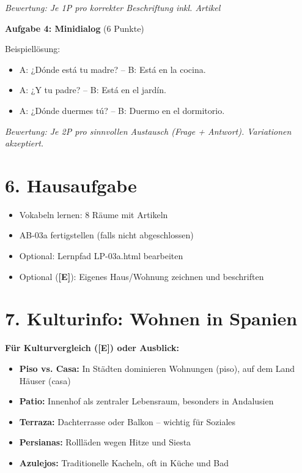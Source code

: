 \documentclass[11pt, a4paper]{article}
\newcommand{\E}{\textcolor{erweiterung}{\textbf{[E]}}}
\begin{document}
\textit{Bewertung: Je 1P pro korrekter Beschriftung inkl. Artikel}

\vspace{1em}

\textbf{Aufgabe 4: Minidialog} (6 Punkte)

Beispiellösung:
\begin{itemize}
    \item A: ¿Dónde está tu madre? -- B: Está en la cocina.
    \item A: ¿Y tu padre? -- B: Está en el jardín.
    \item A: ¿Dónde duermes tú? -- B: Duermo en el dormitorio.
\end{itemize}

\textit{Bewertung: Je 2P pro sinnvollen Austausch (Frage + Antwort). Variationen akzeptiert.}


\section*{6. Hausaufgabe}

\begin{itemize}
    \item Vokabeln lernen: 8 Räume mit Artikeln
    \item AB-03a fertigstellen (falls nicht abgeschlossen)
    \item Optional: Lernpfad LP-03a.html bearbeiten
    \item Optional (\E{}): Eigenes Haus/Wohnung zeichnen und beschriften
\end{itemize}


\section*{7. Kulturinfo: Wohnen in Spanien}

\textbf{Für Kulturvergleich (\E{}) oder Ausblick:}

\begin{itemize}
    \item \textbf{Piso vs. Casa:} In Städten dominieren Wohnungen (piso), auf dem Land Häuser (casa)
    \item \textbf{Patio:} Innenhof als zentraler Lebensraum, besonders in Andalusien
    \item \textbf{Terraza:} Dachterrasse oder Balkon -- wichtig für Soziales
    \item \textbf{Persianas:} Rollläden wegen Hitze und Siesta
    \item \textbf{Azulejos:} Traditionelle Kacheln, oft in Küche und Bad
\end{itemize}
\end{document}

